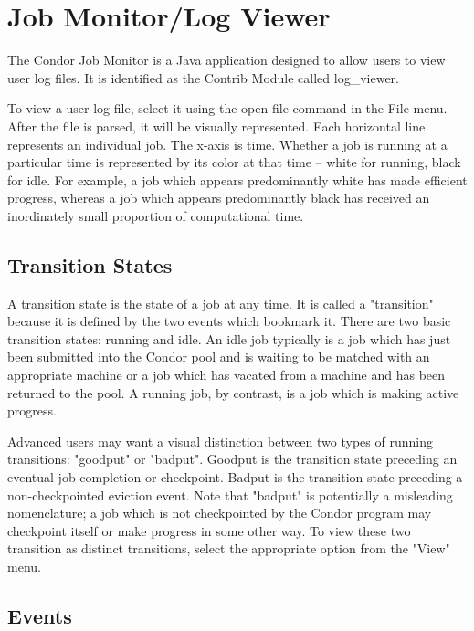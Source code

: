 \section{Job Monitor/Log Viewer}

The Condor Job Monitor is a Java application designed to allow users to 
view user log files. 
It is identified as the Contrib Module called log\_viewer. 

To view a user log file, select it using the open file command in the File menu.  After the file is parsed, it will be visually represented.  Each horizontal line represents an individual job.  The x-axis
is time.  Whether a job is running at a particular time is represented by its color at that time -- white for running, black for idle.  For example, a job which appears predominantly white has made
efficient progress, whereas a job which appears predominantly black has received an inordinately small proportion of computational time. 


\subsection{\label{sec:transition-states}Transition States}

A transition state is the state of a job at any time.  It is called a "transition" because it is defined by the two events which bookmark it.  There are two basic transition states: running and idle. 
An idle job typically is a job which has just been submitted into the Condor pool and is waiting to be matched with an appropriate machine or a job which has vacated from a machine and has been
returned to the pool.  A running job, by contrast, is a job which is making active progress. 

Advanced users may want a visual distinction between two types of running transitions: "goodput" or "badput".  Goodput is the transition state preceding an eventual job completion or
checkpoint.  Badput is the transition state preceding a non-checkpointed eviction event.  Note that "badput" is potentially a misleading nomenclature; a job which is not checkpointed by the
Condor program may checkpoint itself or make progress in some other way.  To view these two transition as distinct transitions, select the appropriate option from the "View" menu. 


\subsection{\label{sec:events}Events}

